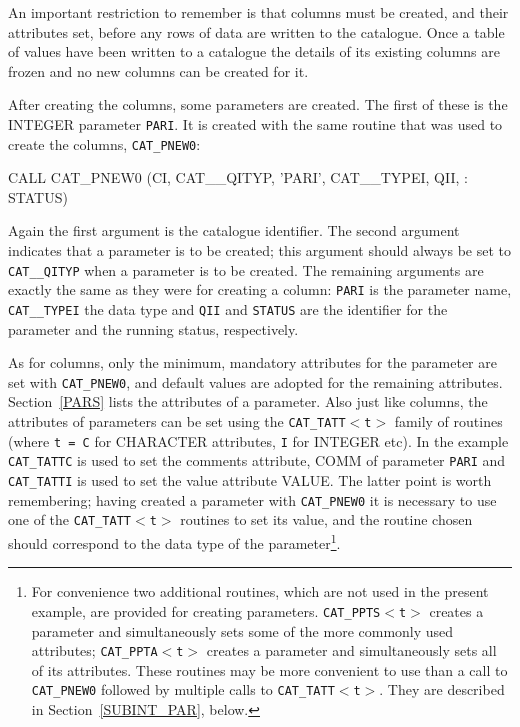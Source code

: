 \documentclass[11pt,twoside]{starlink}
\begin{document}
An important restriction to remember is that columns must be created,
and their attributes set, before any rows of data are written to the
catalogue. Once a table of values have been written to a catalogue the
details of its existing columns are frozen and no new columns can be
created for it.

After creating the columns, some parameters are created. The first of
these is the INTEGER parameter \texttt{PARI}. It is created with the same
routine that was used to create the columns, \texttt{CAT\_PNEW0}:

\begin{terminalv}
         CALL CAT_PNEW0 (CI, CAT__QITYP, 'PARI', CAT__TYPEI, QII,
     :     STATUS)
\end{terminalv}

Again the first argument is the catalogue identifier. The second
argument indicates that a parameter is to be created; this argument
should always be set to \texttt{CAT\_\_QITYP} when a parameter is to be
created. The remaining arguments are exactly the same as they were for
creating a column: \texttt{PARI} is the parameter name, \texttt{CAT\_\_TYPEI}
the data type and \texttt{QII} and \texttt{STATUS} are the identifier for the
parameter and the running status, respectively.

As for columns, only the minimum, mandatory attributes for the parameter
are set with \texttt{CAT\_PNEW0}, and default values are adopted for the
remaining attributes. Section~\ref{PARS} lists the attributes of a
parameter. Also just like columns, the attributes of parameters can be
set using the \texttt{CAT\_TATT$<$t$>$} family of routines (where \texttt{t = C} for CHARACTER attributes, \texttt{I} for INTEGER etc). In the
example \texttt{CAT\_TATTC} is used to set the comments attribute, COMM of
parameter \texttt{PARI} and \texttt{CAT\_TATTI} is used to set the value
attribute VALUE. The latter point is worth remembering; having created
a parameter with \texttt{CAT\_PNEW0} it is necessary to use one of the \texttt{CAT\_TATT$<$t$>$} routines to set its value, and the routine chosen
should correspond to the data type of the parameter\footnote{For
convenience two additional routines, which are not used in the present
example, are provided for creating parameters. \texttt{CAT\_PPTS$<$t$>$}
creates a parameter and simultaneously sets some of the more commonly
used attributes; \texttt{CAT\_PPTA$<$t$>$} creates a parameter and
simultaneously sets all of its attributes. These routines may be more
convenient to use than a call to \texttt{CAT\_PNEW0} followed by multiple
calls to \texttt{CAT\_TATT$<$t$>$}. They are described in
Section~\ref{SUBINT_PAR}, below.}.
\end{document}
